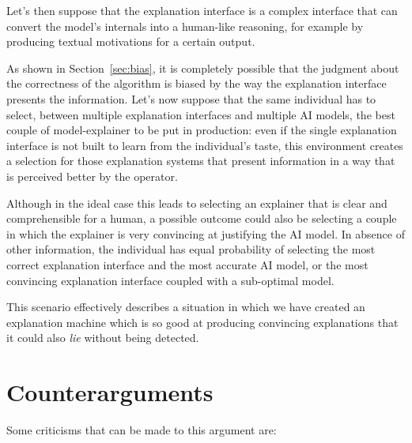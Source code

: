\documentclass[conference]{IEEEtran}
\begin{document}
Let's then suppose that the explanation interface is a complex interface that
can convert the model's internals into a human-like reasoning, for example by
producing textual motivations for a certain output.

As shown in Section~\ref{sec:bias}, it is completely possible that the judgment
about the correctness of the algorithm is biased by the way the explanation
interface presents the information. Let's now suppose that the same individual
has to select,  between multiple explanation interfaces and multiple AI models,
the best couple of model-explainer to be put in production: even if the single
explanation interface is not built to learn from the individual's taste, this
environment creates a selection for those explanation systems that present
information in a way that is perceived better by the operator.

Although in the ideal case this leads to selecting an explainer that is clear
and comprehensible for a human, a possible outcome could also be selecting a
couple in which the explainer is very convincing at justifying the AI model. In
absence of other information, the individual has equal probability of selecting
the most correct explanation interface and the most accurate AI model, or the
most convincing explanation interface coupled with a sub-optimal model.

This scenario effectively describes a situation in which we have created an
explanation machine which is so good at producing convincing explanations that
it could also \textit{lie} without being detected.


\section{Counterarguments}
\label{sec:counterarg}

Some criticisms that can be made to this argument are:
\end{document}
